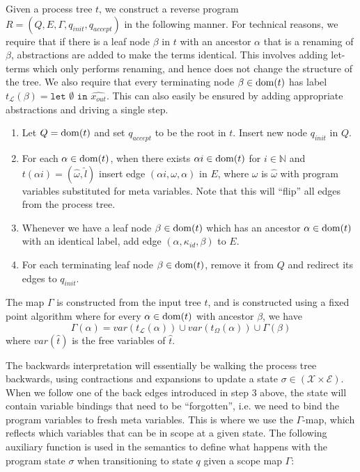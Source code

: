 \documentclass[10pt]{../sigplanconf}
\newcommand{\dom}{\ensuremath{{\rm dom}}}
\newcommand{\w}[1]{\ensuremath{\widehat{#1}}}
\begin{document}
Given a process tree $t$, we construct a reverse program
$R=(Q,E,\Gamma,q_{init},q_{accept})$ in the following manner. For
technical reasons, we require that if there is a leaf node $\beta$ in
$t$ with an ancestor $\alpha$ that is a renaming of $\beta$,
abstractions are added to make the terms identical. This involves
adding let-terms which only performs renaming, and hence does not
change the structure of the tree. We also require that every
terminating node $\beta\in\dom(t)$ has label $t_{\mathcal{L}}(\beta) =
\texttt{let $\emptyset$ in $\w{x_{out}}$}$. This can also easily be
ensured by adding appropriate abstractions and driving a single step.
\begin{enumerate}
  \item Let $Q = \dom(t)$ and set $q_{accept}$ to be the root in
    $t$. Insert new node $q_{init}$ in $Q$.
  \item For each $\alpha \in \dom(t)$, when there exists $\alpha i \in
    \dom(t)$ for $i \in \mathbb{N}$ and $t(\alpha i) = (\w{\omega},
    \w{l})$ insert edge $(\alpha i, \omega, \alpha)$ in $E$, where
    $\omega$ is $\w{\omega}$ with program variables substituted for
    meta variables. Note that this will ``flip'' all edges from the
    process tree.
  \item Whenever we have a leaf node $\beta \in \dom(t)$ which has an
    ancestor $\alpha\in\dom(t)$ with an identical label, add edge
    $(\alpha, \kappa_{id}, \beta)$ to $E$.
  \item For each terminating leaf node $\beta\in\dom(t)$, remove it
    from $Q$ and redirect its edges to $q_{init}$.
\end{enumerate}

The map $\Gamma$ is constructed from the input tree $t$, and is
constructed using a fixed point algorithm where for every
$\alpha\in\dom(t)$ with ancestor $\beta$, we have
$$
  \Gamma(\alpha) = var(t_{\mathcal{L}}(\alpha)) \cup var(t_\Omega(\alpha)) \cup \Gamma(\beta)
$$
where $var(\w{t})$ is the free variables of $\w{t}$.

The backwards interpretation will essentially be walking the process
tree backwards, using contractions and expansions to update a state
$\sigma \in (\mathcal{X} \times \mathcal{E})$. When we follow one of
the back edges introduced in step 3 above, the state will contain
variable bindings that need to be ``forgotten'', i.e. we need to bind
the program variables to fresh meta variables. This is where we use
the $\Gamma$-map, which reflects which variables that can be in scope
at a given state. The following auxiliary function is used in the
semantics to define what happens with the program state $\sigma$ when
transitioning to state $q$ given a scope map $\Gamma$:
\end{document}
